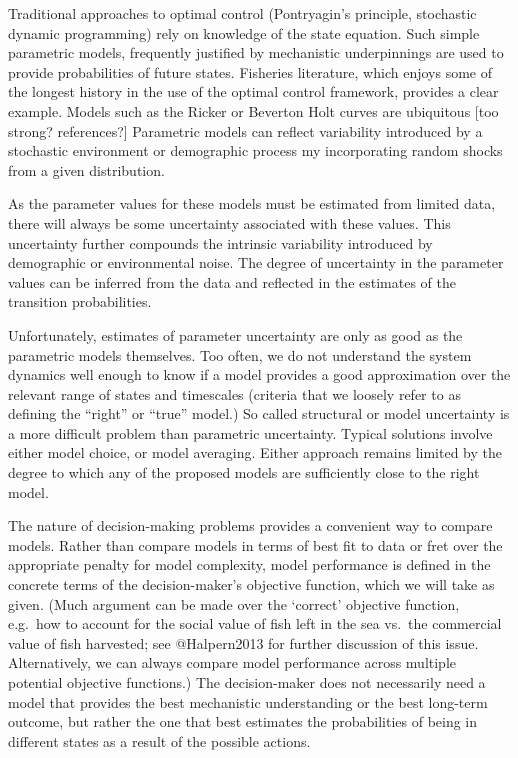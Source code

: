 \documentclass[author-year, review]{elsarticle} %
\begin{document}
Traditional approaches to optimal control (Pontryagin's principle,
stochastic dynamic programming) rely on knowledge of the state equation.
Such simple parametric models, frequently justified by mechanistic
underpinnings are used to provide probabilities of future states.
Fisheries literature, which enjoys some of the longest history in the
use of the optimal control framework, provides a clear example. Models
such as the Ricker or Beverton Holt curves are ubiquitous {[}too strong?
references?{]} Parametric models can reflect variability introduced by a
stochastic environment or demographic process my incorporating random
shocks from a given distribution.

As the parameter values for these models must be estimated from limited
data,\\there will always be some uncertainty associated with these
values. This uncertainty further compounds the intrinsic variability
introduced by demographic or environmental noise. The degree of
uncertainty in the parameter values can be inferred from the data and
reflected in the estimates of the transition probabilities.

Unfortunately, estimates of parameter uncertainty are only as good as
the parametric models themselves. Too often, we do not understand the
system dynamics well enough to know if a model provides a good
approximation over the relevant range of states and timescales (criteria
that we loosely refer to as defining the ``right'' or ``true'' model.)
So called structural or model uncertainty is a more difficult problem
than parametric uncertainty. Typical solutions involve either model
choice, or model averaging. Either approach remains limited by the
degree to which any of the proposed models are sufficiently close to the
right model.

The nature of decision-making problems provides a convenient way to
compare models. Rather than compare models in terms of best fit to data
or fret over the appropriate penalty for model complexity, model
performance is defined in the concrete terms of the decision-maker's
objective function, which we will take as given. (Much argument can be
made over the `correct' objective function, e.g.~how to account for the
social value of fish left in the sea vs.~the commercial value of fish
harvested; see @Halpern2013 for further discussion of this issue.
Alternatively, we can always compare model performance across multiple
potential objective functions.) The decision-maker does not necessarily
need a model that provides the best mechanistic understanding or the
best long-term outcome, but rather the one that best estimates the
probabilities of being in different states as a result of the possible
actions.
\end{document}
